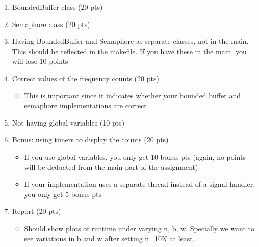 \documentclass[12pt]{extarticle}
\newenvironment{myindentpar}[1]%
 {\begin{list}{}%
         {\setlength{\leftmargin}{#1}}%
         \item[]%
 }
 {\end{list}}
\begin{document}
\begin{myindentpar}{5mm}
	\begin{enumerate}
		\setlength\itemsep{-0.1em}
		\item BoundedBuffer class (20 pts)
		\item Semaphore class (20 pts)
		\item Having BoundedBuffer and Semaphore as separate classes, not in the main. This should be reflected in the makefile. If you have these in the main, you will lose 10 points
		\item Correct values of the frequency counts (20 pts) 
			\begin{itemize}
			\setlength\itemsep{-0.1em}
			\item This is important since it indicates whether your bounded buffer and semaphore implementations are correct
			\end{itemize}
		\item Not having global variables (10 pts)
		\item Bonus: using timers to display the counts (20 pts)
			\begin{itemize}
			\setlength\itemsep{-0.1em}
			\item If you use global variables, you only get 10 bonus pts (again, no points will be deducted from the main part of the assignment)
			\item If your implementation uses a separate thread instead of a signal handler, you only get 5 bonus pts
			\end{itemize}
		\item Report (20 pts)
			\begin{itemize}
			\setlength\itemsep{-0.1em}
			\item Should show plots  of runtime under  varying n, b, w. Specially we want to see variations in b and w after setting n=10K at least.
			\end{itemize}
	\end{enumerate}

\end{myindentpar}
\end{document}
